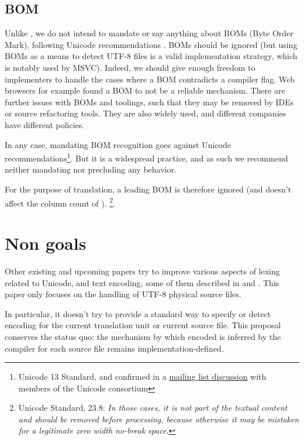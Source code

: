 \documentclass{wg21}
\begin{document}
\subsection{BOM}

Unlike , we do not intend to mandate or say anything about BOMs (Byte Order Mark), following Unicode recommendations \cite{BOM}.
BOMs should be ignored (but using BOMs as a means to detect UTF-8 files is a valid implementation strategy, which is notably used by MSVC).
Indeed, we should give enough freedom to implementers to handle the cases where a BOM contradicts a compiler flag.
Web browsers for example found a BOM to not be a reliable mechanism.
There are further issues with BOMs and toolings, such that they may be removed by IDEs or source refactoring tools.
They are also widely used, and different companies have different policies.

In any case, mandating BOM recognition goes against Unicode recommendations\footnote{Unicode 13 Standard, and confirmed in a \href{https://corp.unicode.org/mailman/private/unicode/2020-June/008716.html}{mailing list discussion} with members of the Unicode consortium}. But it is a widespread practice, and as such we recommend neither mandating nor precluding any behavior.

\pagebreak

For the purpose of translation, a leading BOM is therefore ignored (and doesn't affect the column count of ).
\footnote{Unicode Standard, 23.8: \emph{In those cases, it is not part of the textual content and should be removed before processing, because otherwise it may be mistaken for a legitimate zero width no-break space}.}.

\section{Non goals}

Other existing and upcoming papers try to improve various aspects of lexing related to Unicode, and text encoding, some of them described in 
and .
This paper only focuses on the handling of UTF-8 physical source files.

In particular, it doesn't try to provide a standard  way to specify or detect encoding for the current translation unit or current source file. This proposal conserves the status quo: the mechanism by which encoded is inferred by the compiler for each source file remains implementation-defined.
\end{document}
